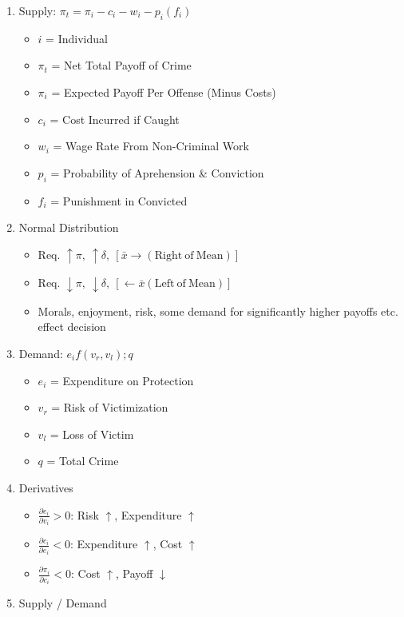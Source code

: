 \documentclass[11pt, english]{article}
\begin{document}
	\begin{enumerate}
	\setlength\itemsep{0cm}
		\item Supply: $\pi_t=\pi_i-c_i-w_i-p_i(f_i)$
		\begin{itemize}
			\item $i$ = Individual
			\item $\pi_t$ = Net Total Payoff of Crime
			\item $\pi_i$ = Expected Payoff Per Offense (Minus Costs)
			\item $c_i$ = Cost Incurred if Caught
			\item $w_i$ = Wage Rate From Non-Criminal Work
			\item $p_i$ = Probability of Aprehension \& Conviction
			\item $f_i$ = Punishment in Convicted
		\end{itemize}
		\item Normal Distribution
		\begin{itemize}
			\item Req. $\uparrow\pi,\ \uparrow\delta,\ [\bar{x}\rightarrow\mathrm{(Right\ of\ Mean)}]$
			\item Req. $\downarrow\pi,\ \downarrow\delta,\ [\leftarrow\bar{x}\mathrm{(Left\ of\ Mean)}]$
			\item Morals, enjoyment, risk, some demand for significantly higher payoffs etc. effect decision
		\end{itemize}
		\item Demand: $e_if(v_r,v_l);q$
		\begin{itemize}
			\item $e_i$ = Expenditure on Protection
			\item $v_r$ = Risk of Victimization
			\item $v_l$ = Loss of Victim
			\item $q$ = Total Crime
		\end{itemize}
		\item Derivatives
		\begin{itemize}
			\item $\frac{\partial e_i}{\partial v_i}>0$: Risk $\uparrow$, Expenditure $\uparrow$
			\item $\frac{\partial c_i}{\partial e_i}<0$: Expenditure $\uparrow$, Cost $\uparrow$
			\item $\frac{\partial\pi_i}{\partial c_i}<0$: Cost $\uparrow$, Payoff $\downarrow$
		\end{itemize}
		\item Supply / Demand
		\begin{itemize}

\end{itemize}
\end{enumerate}
\end{document}
